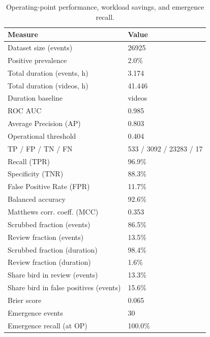 \begin{table}
\caption{Operating-point performance, workload savings, and emergence recall.}
\label{tab:summary}
\begin{tabular}{ll}
\toprule
Measure & Value \\
\midrule
Dataset size (events) & 26925 \\
Positive prevalence & 2.0\% \\
Total duration (events, h) & 3.174 \\
Total duration (videos, h) & 41.446 \\
Duration baseline & videos \\
ROC AUC & 0.985 \\
Average Precision (AP) & 0.803 \\
Operational threshold & 0.404 \\
TP / FP / TN / FN & 533 / 3092 / 23283 / 17 \\
Recall (TPR) & 96.9\% \\
Specificity (TNR) & 88.3\% \\
False Positive Rate (FPR) & 11.7\% \\
Balanced accuracy & 92.6\% \\
Matthews corr. coeff. (MCC) & 0.353 \\
Scrubbed fraction (events) & 86.5\% \\
Review fraction (events) & 13.5\% \\
Scrubbed fraction (duration) & 98.4\% \\
Review fraction (duration) & 1.6\% \\
Share bird in review (events) & 13.3\% \\
Share bird in false positives (events) & 15.6\% \\
Brier score & 0.065 \\
Emergence events & 30 \\
Emergence recall (at OP) & 100.0\% \\
\bottomrule
\end{tabular}
\end{table}
